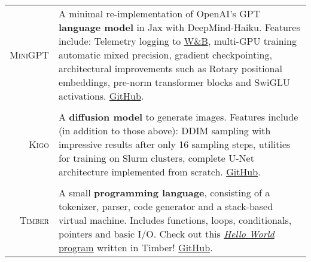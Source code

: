 \documentclass[11pt]{article}
\begin{document}
\begin{tabularx}{\textwidth}{rX}

    \textsc{MiniGPT} & A minimal re-implementation of OpenAI's GPT
    \textbf{language model} in Jax with DeepMind-Haiku. Features include:
    Telemetry logging to \href{https://wandb.ai}{W\&B}, multi-GPU training
    automatic mixed precision, gradient checkpointing, architectural
    improvements such as Rotary positional embeddings, pre-norm transformer
    blocks and SwiGLU activations.
    \href{https://github.com/nlsfnr/MiniGPT}{GitHub}. \\

    \multicolumn{2}{c}{} \\

    \textsc{Kigo} & A \textbf{diffusion model} to generate images. Features
    include (in addition to those above): DDIM sampling with impressive results
    after only 16 sampling steps, utilities for training on Slurm clusters,
    complete U-Net architecture implemented from scratch.
    \href{https://github.com/nlsfnr/Kigo}{GitHub}. \\

    \multicolumn{2}{c}{} \\

    \textsc{Timber} & A small \textbf{programming language}, consisting of a
    tokenizer, parser, code generator and a stack-based virtual machine. Includes
    functions, loops, conditionals, pointers and basic I/O. Check out this
    \href{https://github.com/nlsfnr/timber/blob/master/code.timber}{\textit{Hello
    World} program} written in Timber! \href{https://github.com/nlsfnr/timber}{GitHub}.
    \\

\end{tabularx}
\end{document}

